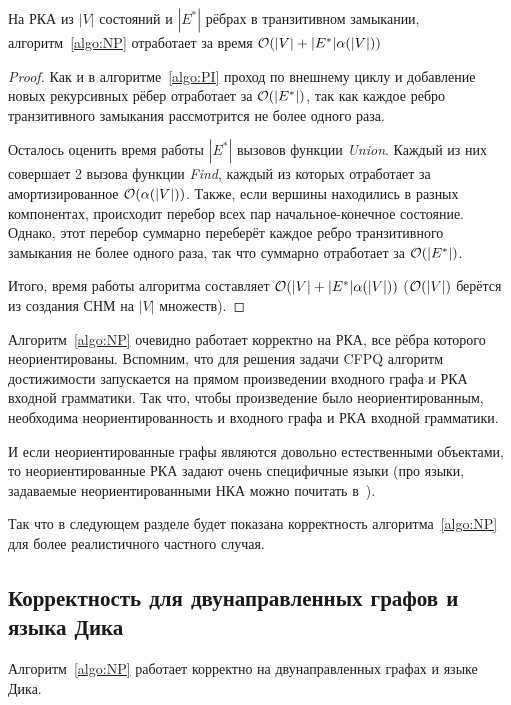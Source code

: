 \begin{theorem}\label{thm:bidirected}
  На РКА из $|V|$ состояний и $|E^{*}|$ рёбрах в транзитивном замыкании, алгоритм~\ref{algo:NP} отработает за время $\mathcal{O}(|V| + |E^{*}| \alpha(|V|))$
\end{theorem}

\begin{proof}
  Как и в алгоритме~\ref{algo:PI} проход по внешнему циклу и добавление новых рекурсивных рёбер отработает за $\mathcal{O}(|E^{*}|)$, так как каждое ребро транзитивного замыкания рассмотрится не более одного раза.

  Осталось оценить время работы $|E^{*}|$ вызовов функции \textit{Union}. Каждый из них совершает 2 вызова функции \textit{Find}, каждый из которых отработает за амортизированное $\mathcal{O}(\alpha(|V|))$. Также, если вершины находились в разных компонентах, происходит перебор всех пар начальное-конечное состояние. Однако, этот перебор суммарно переберёт каждое ребро транзитивного замыкания не более одного раза, так что суммарно отработает за $\mathcal{O}(|E^{*}|)$.

  Итого, время работы алгоритма составляет $\mathcal{O}(|V| + |E^{*}| \alpha(|V|))$ ($\mathcal{O}(|V|)$ берётся из создания СНМ на $|V|$ множеств). 
\end{proof}

\begin{note}
  Алгоритм~\ref{algo:NP} очевидно работает корректно на РКА, все рёбра которого неориентированы. Вспомним, что для решения задачи CFPQ алгоритм достижимости запускается на прямом произведении входного графа и РКА входной грамматики. Так что, чтобы произведение было неориентированным, необходима неориентированность и входного графа и РКА входной грамматики. 

  И если неориентированные графы являются довольно естественными объектами, то неориентированные РКА задают очень специфичные языки (про языки, задаваемые неориентированными НКА можно почитать в~\cite{Kutrib18}). 

  Так что в следующем разделе будет показана корректность алгоритма~\ref{algo:NP} для более реалистичного частного случая.
\end{note}

\subsection{Корректность для двунаправленных графов и языка Дика}

\begin{theorem}\label{th:bidir_corr}
  Алгоритм~\ref{algo:NP} работает корректно на двунаправленных графах и языке Дика.
\end{theorem}

